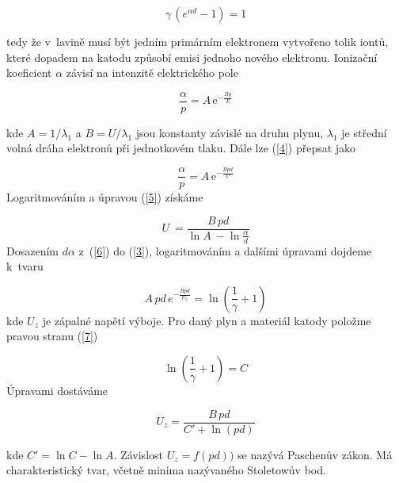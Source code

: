 \documentclass[a4paper,12pt]{article}
\newcommand{\e}{\text{e}}
\begin{document}
\begin{equation}
	\gamma\,(e^{\alpha d } - 1) = 1
	\label{3}
\end{equation} 

tedy že v~lavině musí být jedním primárním elektronem vytvořeno tolik iontů, které dopadem na katodu způsobí emisi jednoho nového elektronu. Ionizační koeficient $\alpha$ závisí na intenzitě elektrického pole 

\begin{equation}
	\frac{\alpha}{p} = A\,\e^{-\frac{Bp}{E}} 
	\label{4}
\end{equation}

kde $A = 1/\lambda_1$ a $B = U/\lambda_1$ jsou konstanty závislé na druhu plynu, $\lambda_1$ je střední volná dráha elektronů při jednotkovém tlaku. Dále lze (\ref{4}) přepsat jako

\begin{equation}
	\frac{\alpha}{p} = A\,\e^{-\frac{Bpd}{U}} 
	\label{5}
\end{equation}
Logaritmováním a úpravou (\ref{5}) získáme

\begin{equation}
	U~= \frac{B\,pd}{\ln A~- \ln \frac{\alpha}{d}}
	\label{6}
\end{equation}
Dosazením $d\alpha$ z~(\ref{6}) do (\ref{3}), logaritmováním a dalšími úpravami dojdeme k~tvaru

\begin{equation}
	A\,pd\,e^{-\frac{Bpd}{U_z}} = \ln \left(\frac{1}{\gamma} + 1\right)
	\label{7}
\end{equation}
kde $U_z$ je zápalné napětí výboje. Pro daný plyn a materiál katody položme pravou stranu (\ref{7})

\begin{equation}
	\ln \left(\frac{1}{\gamma} + 1\right) = C
	\label{8}
\end{equation}
Úpravami dostáváme

\begin{equation}
	U_z = \frac{B\,pd}{C' + \ln(pd)}
	\label{9}
\end{equation}

kde $C' = \ln C - \ln A$. Závislost $U_z = f (pd))$ se nazývá Paschenův zákon. Má charakteristický tvar, včetně minima nazývaného Stoletowův bod.
\end{document}
